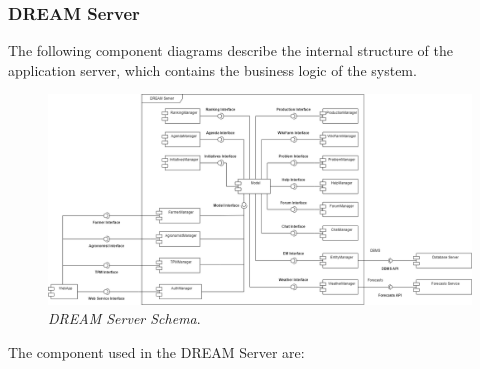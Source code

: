 \subsubsection{DREAM Server}
The following component diagrams describe the internal structure of the application server, which contains the business logic of the system.\\
\begin{figure}[H]
    \centering
    \includegraphics[scale=0.3]{Images/Components/ComponentDiagram - DREAMServer.png}
    \caption{\textit{DREAM Server Schema}.}
\end{figure}
The component used in the DREAM Server are:

